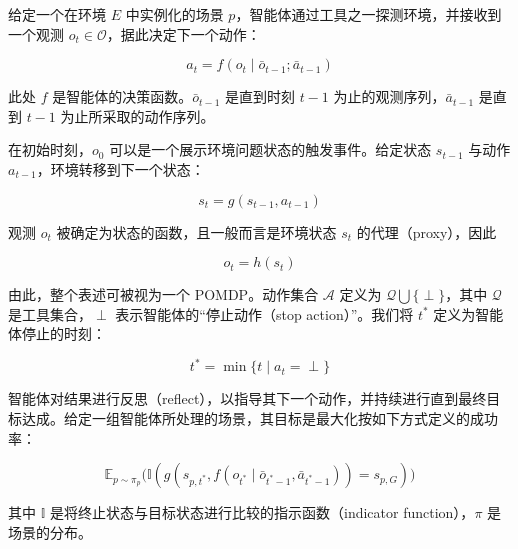 给定一个在环境 $E$ 中实例化的场景 $p$，智能体通过工具之一探测环境，并接收到一个观测 $o_t \in \mathcal{O}$，据此决定下一个动作：

\begin{equation}
a_t = f(o_t \mid \bar o_{t-1}; \bar a_{t-1}) \tag{1}
\end{equation}

此处 $f$ 是智能体的决策函数。$\bar o_{t-1}$ 是直到时刻 $t-1$ 为止的观测序列，$\bar a_{t-1}$ 是直到 $t-1$ 为止所采取的动作序列。

在初始时刻，$o_0$ 可以是一个展示环境问题状态的触发事件。给定状态 $s_{t-1}$ 与动作 $a_{t-1}$，环境转移到下一个状态：

\begin{equation}
s_t = g(s_{t-1}, a_{t-1}) \tag{2}
\end{equation}

观测 $o_t$ 被确定为状态的函数，且一般而言是环境状态 $s_t$ 的代理（proxy），因此

\begin{equation}
o_t = h(s_t) \tag{3}
\end{equation}

由此，整个表述可被视为一个 POMDP。动作集合 $\mathcal{A}$ 定义为 $\mathcal{Q} \bigcup \{\perp\}$，其中 $\mathcal{Q}$ 是工具集合，$\perp$ 表示智能体的“停止动作（stop action）”。我们将 $t^*$ 定义为智能体停止的时刻：

\begin{equation}
t^* = \min\{t \mid a_t = \perp\} \tag{4}
\end{equation}

智能体对结果进行反思（reflect），以指导其下一个动作，并持续进行直到最终目标达成。给定一组智能体所处理的场景，其目标是最大化按如下方式定义的成功率：

\begin{equation}
\mathbb{E}_{p\sim\pi_p}\big( \mathbb{I}( g(s_{p,t^*}, f(o_{t^*}\mid \bar o_{t^*-1}, \bar a_{t^*-1})) = s_{p,G}) \big) \tag{5}
\end{equation}

其中 $\mathbb{I}$ 是将终止状态与目标状态进行比较的指示函数（indicator function），$\pi$ 是场景的分布。

